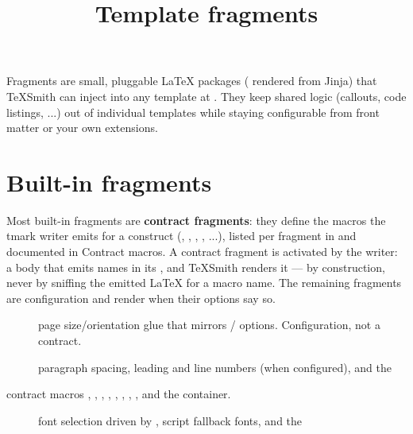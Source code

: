 \documentclass[a4paper,twoside]{article}
\title{Template fragments}
\author{}\date{}
\begin{document}
\maketitle
Fragments are small, pluggable \LaTeX{} packages ( rendered from Jinja) that
TeXSmith can inject into any template at . They keep
shared logic (callouts, code listings, ...) out of individual templates
while staying configurable from front matter or your own extensions.
\section{Built-in fragments}
Most built-in fragments are \textbf{contract fragments}: they define the macros
the tmark writer emits for a construct (, , ,
, ...), listed per fragment in  and documented in
Contract macros. A contract fragment is activated by the writer:
a body that emits  names  in its
, and TeXSmith renders it --- by construction, never by
sniffing the emitted \LaTeX{} for a macro name. The remaining fragments are
configuration and render when their options say so.
\begin{description}
\item[{}] page size/orientation glue that mirrors / options. Configuration, not a contract.
\item[{}] paragraph spacing, leading and line numbers (when configured), and the
\end{description}
contract macros , , , , ,
, , ,  and the  container.
\begin{description}
\item[{}] font selection driven by , script fallback fonts, and the
\end{description}
\end{document}
